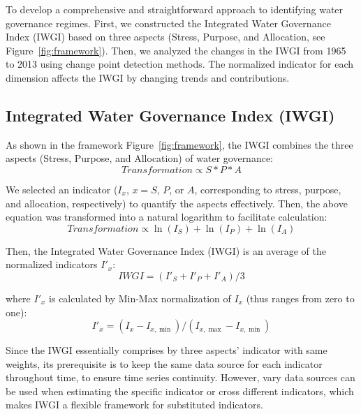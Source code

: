 
To develop a comprehensive and straightforward approach to identifying water governance regimes. First, we constructed the Integrated Water Governance Index (IWGI) based on three aspects (Stress, Purpose, and Allocation, see Figure~\ref{fig:framework}). Then, we analyzed the changes in the IWGI from 1965 to 2013 using change point detection methods. The normalized indicator for each dimension affects the IWGI by changing trends and contributions.

\subsection{Integrated Water Governance Index (IWGI)}

	As shown in the framework Figure~\ref{fig:framework}, the IWGI combines the three aspects (Stress, Purpose, and Allocation) of water governance:
	\begin{equation}
		Transformation \propto S*P*A
	\end{equation}

	We selected an indicator ($I_x$, $x=S$, $P$, or $A$, corresponding to stress, purpose, and allocation, respectively) to quantify the aspects effectively. Then, the above equation was transformed into a natural logarithm to facilitate calculation:
	\begin{equation}
		Transformation \propto \ln(I_S) + \ln(I_P) + \ln(I_A)
	\end{equation}

	Then, the Integrated Water Governance Index (IWGI) is an average of the normalized indicators $I'_x$:
	\begin{equation}
		IWGI = (I'_S + I'_P + I'_A) / 3
	\end{equation}

	where $I'_x$ is calculated by Min-Max normalization of $I_x$ (thus ranges from zero to one):
	\begin{equation}
		I'_x = (I_x - I_{x, \min}) / (I_{x, \max} - I_{x, \min})
	\end{equation}

	Since the IWGI essentially comprises by three aspects' indicator with same weights, its prerequisite is to keep the same data source for each indicator throughout time, to ensure time series continuity.
	However, vary data sources can be used when estimating the specific indicator or cross different indicators, which makes IWGI a flexible framework for substituted indicators.

